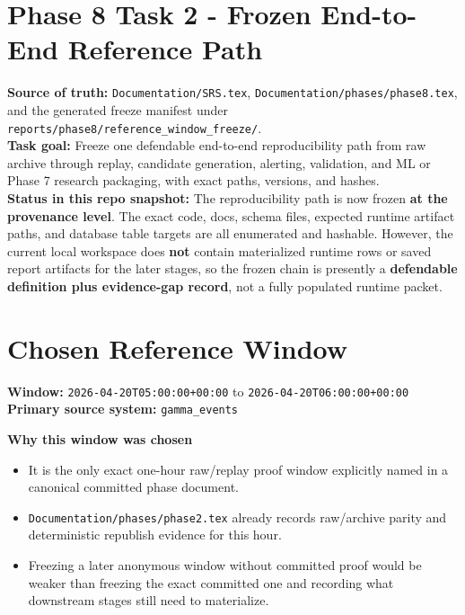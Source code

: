 \documentclass{article}
\begin{document}
\section*{Phase 8 Task 2 - Frozen End-to-End Reference Path}

\textbf{Source of truth:} \texttt{Documentation/SRS.tex}, \texttt{Documentation/phases/phase8.tex}, and the generated freeze manifest under \texttt{reports/phase8/reference\_window\_freeze/}.\\
\textbf{Task goal:} Freeze one defendable end-to-end reproducibility path from raw archive through replay, candidate generation, alerting, validation, and ML or Phase 7 research packaging, with exact paths, versions, and hashes.\\
\textbf{Status in this repo snapshot:} The reproducibility path is now frozen \textbf{at the provenance level}. The exact code, docs, schema files, expected runtime artifact paths, and database table targets are all enumerated and hashable. However, the current local workspace does \textbf{not} contain materialized runtime rows or saved report artifacts for the later stages, so the frozen chain is presently a \textbf{defendable definition plus evidence-gap record}, not a fully populated runtime packet.

\section*{Chosen Reference Window}
\textbf{Window:} \texttt{2026-04-20T05:00:00+00:00} to \texttt{2026-04-20T06:00:00+00:00}\\
\textbf{Primary source system:} \texttt{gamma\_events}

\textbf{Why this window was chosen}
\begin{itemize}
\item It is the only exact one-hour raw/replay proof window explicitly named in a canonical committed phase document.
\item \texttt{Documentation/phases/phase2.tex} already records raw/archive parity and deterministic republish evidence for this hour.
\item Freezing a later anonymous window without committed proof would be weaker than freezing the exact committed one and recording what downstream stages still need to materialize.
\end{itemize}
\end{document}
